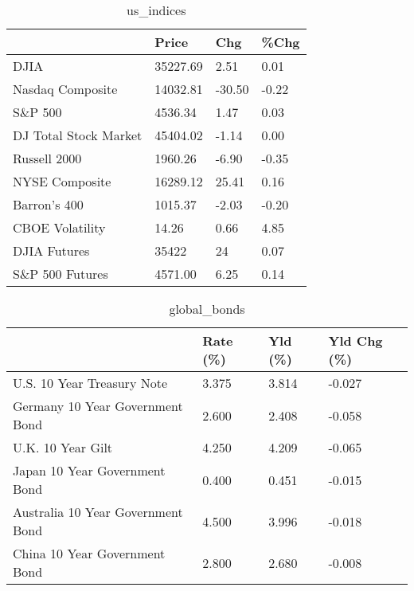 \documentclass{article}%
\begin{document}
%


\begin{table}[htbp]%
\caption{us\_indices}%
\centering%
\begin{adjustbox}{width=1\textwidth}%
\begin{tabular}{llll}
\toprule
                      &    Price &    Chg &  \%Chg \\
\midrule
                 DJIA & 35227.69 &   2.51 &  0.01 \\
     Nasdaq Composite & 14032.81 & -30.50 & -0.22 \\
              S\&P 500 &  4536.34 &   1.47 &  0.03 \\
DJ Total Stock Market & 45404.02 &  -1.14 &  0.00 \\
         Russell 2000 &  1960.26 &  -6.90 & -0.35 \\
       NYSE Composite & 16289.12 &  25.41 &  0.16 \\
         Barron's 400 &  1015.37 &  -2.03 & -0.20 \\
      CBOE Volatility &    14.26 &   0.66 &  4.85 \\
         DJIA Futures &    35422 &     24 &  0.07 \\
      S\&P 500 Futures &  4571.00 &   6.25 &  0.14 \\
\bottomrule
\end{tabular}
%
\end{adjustbox}%
\end{table}

%


\begin{table}[htbp]%
\caption{global\_bonds}%
\centering%
\begin{adjustbox}{width=1\textwidth}%
\begin{tabular}{llll}
\toprule
                                  & Rate (\%) & Yld (\%) & Yld Chg (\%) \\
\midrule
       U.S. 10 Year Treasury Note &    3.375 &   3.814 &      -0.027 \\
  Germany 10 Year Government Bond &    2.600 &   2.408 &      -0.058 \\
                U.K. 10 Year Gilt &    4.250 &   4.209 &      -0.065 \\
    Japan 10 Year Government Bond &    0.400 &   0.451 &      -0.015 \\
Australia 10 Year Government Bond &    4.500 &   3.996 &      -0.018 \\
    China 10 Year Government Bond &    2.800 &   2.680 &      -0.008 \\
\bottomrule
\end{tabular}
%
\end{adjustbox}%
\end{table}
\end{document}
